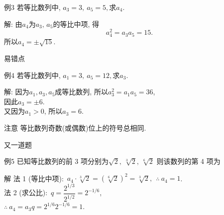 \documentclass[mathserif,blue]{beamer}
\begin{document}
\begin{frame}{}
  \begin{exampleblock}{例3}
    若等比数列\an 中, $a_3=3,\ a_5=5,$求$a_4$.
  \end{exampleblock}
    \pause
  \begin{block}{解:}
    由$a_4$为$a_3,\,a_5$的等比中项, 得
    $$a_4^2=a_3a_5=15.$$\pause
    所以$a_4=\pm\sqrt{15}$.
  \end{block}
\end{frame}


\begin{frame}{易错点}
  \begin{exampleblock}{例4}
    若等比数列\an 中, $a_1=3,\ a_5=12,$求$a_3$.
  \end{exampleblock}\pause
  \begin{block}{解:}
    因为$a_1,a_3,a_5$成等比数列, 所以$a_3^2=a_1a_5=36$,\\
    因此$a_3=\pm6$.\\\pause
    又因为$a_1>0$, 所以$a_3=6$.
  \end{block}
    \pause\vspace{1ex}
  \begin{beamerboxesrounded}[upper=myupcol,lower=mylowcol,shadow=true]{注意}
    等比数列奇数(或偶数)位上的符号总相同.
  \end{beamerboxesrounded}\vspace{9pt}
\end{frame}


\begin{frame}{又一道题}
\begin{exampleblock}{例5}
    已知等比数列\an 的前 3 项分别为$\sqrt2,~\sqrt[3]2,~\sqrt[6]2$%
    则该数列的第 4 项为\pause
  \end{exampleblock}\pause
  \begin{block}{解}
  法 1 (等比中项):~$a_4\cdot\sqrt[3]2=(\sqrt[6]2)^2=\sqrt[3]2,~~\therefore~a_4=1$.\\\vspace{1ex}\pause
  法 2 (求公比):~$q=\dfrac{2^{1/3}}{2^{1/2}}=2^{-1/6}$,\\\vspace{1ex}
  $\therefore~a_4=a_3q=2^{1/6}2^{-1/6}=1.$
  \end{block}
\end{frame}
\end{document}
